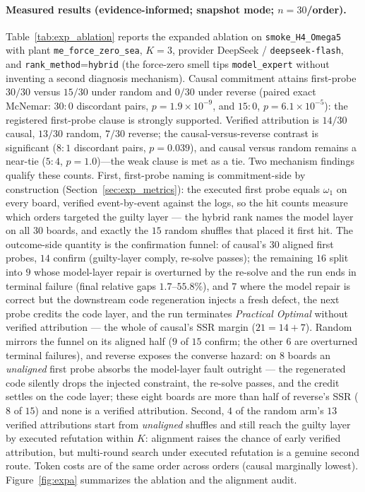 \documentclass[a4paper,fleqn]{cas-sc}
\begin{document}
\paragraph{Measured results (evidence-informed; snapshot mode; $n{=}30$/order).}
Table~\ref{tab:exp_ablation} reports the expanded ablation on
\texttt{smoke\_H4\_Omega5} with plant \texttt{me\_force\_zero\_sea},
$K{=}3$, provider DeepSeek / \texttt{deepseek-flash}, and
\texttt{rank\_method}=\texttt{hybrid} (the force-zero smell tips
\texttt{model\_expert} without inventing a second diagnosis mechanism).
Causal commitment attains first-probe $30/30$ versus $15/30$ under random
and $0/30$ under reverse (paired exact McNemar: $30{:}0$ discordant
pairs, $p=1.9\times10^{-9}$, and $15{:}0$, $p=6.1\times10^{-5}$): the
registered first-probe clause is strongly supported. Verified
attribution is $14/30$ causal, $13/30$ random, $7/30$
reverse; the causal-versus-reverse contrast is significant
($8{:}1$ discordant pairs, $p=0.039$), and causal versus random remains a
near-tie ($5{:}4$, $p=1.0$)---the weak clause is met as a tie. Two
mechanism findings qualify these counts. First, first-probe naming is
commitment-side by construction
(Section~\ref{sec:exp_metrics}): the executed first probe equals
$\omega_1$ on every board, verified event-by-event against the logs, so
the hit counts measure which orders targeted the guilty layer --- the
hybrid rank names the model layer on all $30$ boards, and exactly the
$15$ random shuffles that placed it first hit. The outcome-side quantity
is the confirmation funnel: of causal's $30$ aligned first probes, $14$
confirm (guilty-layer comply, re-solve passes); the remaining $16$ split
into $9$ whose model-layer repair is overturned by the re-solve and the
run ends in terminal failure (final relative gaps $1.7$--$55.8\%$), and
$7$ where the model repair is correct but the downstream code
regeneration injects a fresh defect, the next probe credits the code
layer, and the run terminates \emph{Practical Optimal} without verified
attribution --- the whole of causal's SSR margin ($21{=}14{+}7$). Random
mirrors the funnel on its aligned half ($9$ of $15$ confirm; the other
$6$ are overturned terminal failures), and reverse exposes the converse
hazard: on $8$ boards an \emph{unaligned} first probe absorbs the
model-layer fault outright --- the regenerated code silently drops the
injected constraint, the re-solve passes, and the credit settles on the
code layer; these eight boards are more than half of reverse's SSR
($8$ of $15$) and none is a verified attribution. Second, $4$ of the
random arm's $13$ verified attributions start from \emph{unaligned}
shuffles and still reach the guilty layer by executed refutation within
$K$: alignment raises the chance of early verified attribution, but
multi-round search under executed refutation is a genuine second route.
Token costs are of the same order across orders (causal marginally
lowest). Figure~\ref{fig:expa} summarizes the ablation and the alignment
audit.
\end{document}
